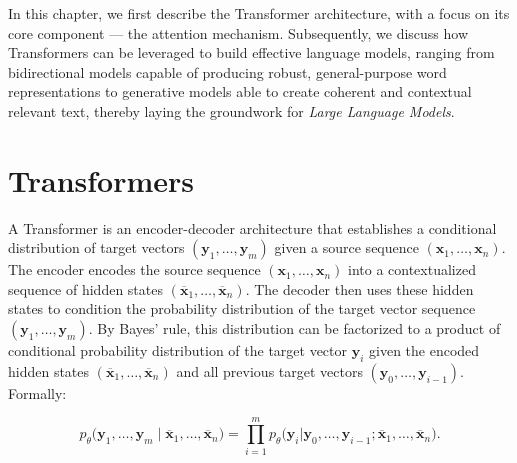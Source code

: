 In this chapter, we first describe the Transformer architecture, with a focus on its core component — the attention mechanism. Subsequently, we discuss how Transformers can be leveraged to build effective language models, ranging from bidirectional models capable of producing robust, general-purpose word representations to generative models able to create coherent and contextual relevant text, thereby laying the groundwork for \textit{Large Language Models}.




\section{Transformers}

A Transformer \citep{vaswani2017attention} is an encoder-decoder architecture that establishes a conditional distribution of target vectors $(\bm{y}_1, \ldots, \bm{y}_m)$ given a source sequence $(\bm{x}_1, \ldots, \bm{x}_n)$. The encoder encodes the source sequence $(\bm{x}_1, \ldots, \bm{x}_n)$ into a contextualized sequence of hidden states $(\overline{\bm{x}}_1, \ldots, \overline{\bm{x}}_n)$. The decoder then uses these hidden states to condition the probability distribution of the target vector sequence $(\bm{y}_1, \ldots, \bm{y}_m)$. By Bayes' rule, this distribution can be factorized to a product of conditional probability distribution of the target vector $\bm{y}_i$ given the encoded hidden states $(\overline{\bm{x}}_1, \ldots, \overline{\bm{x}}_n)$ and all previous target vectors $(\bm{y}_0, \ldots, \bm{y}_{i-1})$. Formally:

\begin{equation}
    p_{\theta} \bigl( \bm{y}_1, \ldots, \bm{y}_m \mid \overline{\bm{x}}_1, \ldots, \overline{\bm{x}}_n \bigr) = \prod_{i=1}^{m} p_{\theta}\bigl(\bm{y}_i |\bm{y}_0, \ldots, \bm{y}_{i-1}; \overline{\bm{x}}_1, \ldots, \overline{\bm{x}}_n\bigr).
\end{equation}

